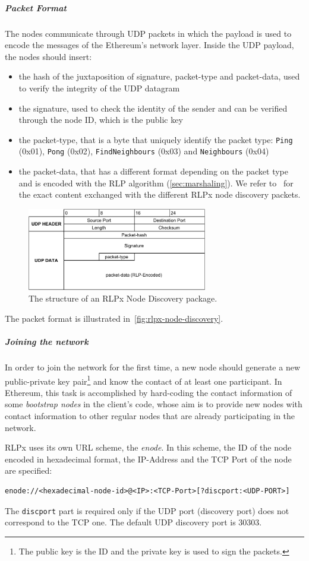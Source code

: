 \subparagraph{Packet Format}
The nodes communicate through UDP packets in which the payload is used to encode
the messages of the Ethereum's network layer. Inside the UDP payload, the nodes
should insert:
\begin{itemize}
    \item the hash of the juxtaposition of signature, packet-type and
    packet-data, used to verify the integrity of the UDP datagram
    \item the signature, used to check the identity of the sender and can be
    verified through the node ID, which is the public key
    \item the packet-type, that is a byte that uniquely identify the packet
    type: \texttt{Ping} (0x01), \texttt{Pong} (0x02), \texttt{FindNeighbours}
    (0x03) and \texttt{Neighbours} (0x04)~\cite{bib:rlpx-discovery-protocol}
    \item the packet-data, that has a different format depending on the packet
    type and is encoded with the RLP algorithm (\autoref{sec:marshaling}). We
    refer to~\cite{bib:rlpx-discovery-protocol} for the exact content exchanged
    with the different RLPx node discovery packets.
\end{itemize}
\begin{figure}
    \begin{center}
    \includegraphics[width=0.7\textwidth]{./res/img/rlp-node-discovery-packet-format.pdf}
    \caption{The structure of an RLPx Node Discovery package.}
    \label{fig:rlpx-node-discovery}
    \end{center}
\end{figure}

The packet format is illustrated in~\autoref{fig:rlpx-node-discovery}.


\subparagraph{Joining the network}
In order to join the network for the first time, a new node should generate a
new public-private key pair\footnote{The public key is the ID and the private
key is used to sign the packets.} and know the contact of at least one
participant. In Ethereum, this task is accomplished by hard-coding the contact
information of some \textit{bootstrap nodes} in the client's code, whose aim is
to provide new nodes with contact information to other regular nodes that are
already participating in the network.

RLPx uses its own URL scheme, the \emph{enode}. In this scheme, the ID of the
node encoded in hexadecimal format, the IP-Address and the TCP Port of the node
are specified:
\begin{verbatim}
enode://<hexadecimal-node-id>@<IP>:<TCP-Port>[?discport:<UDP-PORT>]
\end{verbatim}
The \verb|discport| part is required only if the UDP port (discovery port) does
not correspond to the TCP one. The default UDP discovery port is 30303.
